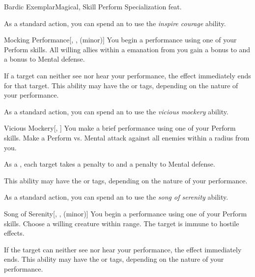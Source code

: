     \begin{feat}{Bardic Exemplar}{Magical, Skill}
        \featpre Perform Specialization feat.

         As a standard action, you can spend an  to use the \textit{inspire courage} ability.
        \begin{ability}{Mocking Performance}[, ,  (minor)]
            You begin a performance using one of your Perform skills.
            All willing allies within a \areahuge emanation from you gain a  bonus to  and a  bonus to Mental defense.

            If a target can neither see nor hear your performance, the effect immediately ends for that target.
            This ability may have the  or  tags, depending on the nature of your performance.
        \end{ability}

         As a standard action, you can spend an  to use the \textit{vicious mockery} ability.
        \begin{ability}{Vicious Mockery}[, ]
            You make a brief performance using one of your Perform skills.
            Make a Perform vs. Mental attack against all enemies within a \areahuge radius from you.

            \hit As a , each target takes a  penalty to  and a  penalty to Mental defense.

            This ability may have the  or  tags, depending on the nature of your performance.
        \end{ability}

         As a standard action, you can spend an  to use the \textit{song of serenity} ability.
        \begin{ability}{Song of Serenity}[, ,  (minor)]
            You begin a performance using one of your Perform skills.
            Choose a willing creature within \rngmed range.
            The target is immune to hostile  effects.

            If the target can neither see nor hear your performance, the effect immediately ends.
            This ability may have the  or  tags, depending on the nature of your performance.
        \end{ability}


\end{feat}
